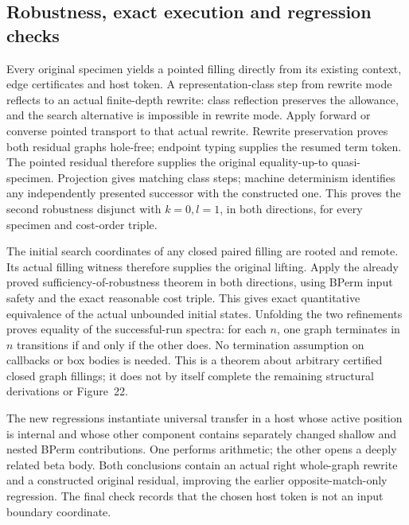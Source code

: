 \subsection{Robustness, exact execution and regression checks}
Every original specimen yields a pointed filling directly from its existing
context, edge certificates and host token. A representation-class step from
rewrite mode reflects to an actual finite-depth rewrite: class reflection
preserves the allowance, and the search alternative is impossible in rewrite
mode. Apply forward or converse pointed transport to that actual rewrite.
Rewrite preservation proves both residual graphs hole-free; endpoint typing
supplies the resumed term token. The pointed residual therefore supplies the
original equality-up-to quasi-specimen. Projection gives matching class
steps; machine determinism identifies any independently presented successor
with the constructed one. This proves the second robustness disjunct with
$k=0,l=1$, in both directions, for every specimen and cost-order triple.


The initial search coordinates of any closed paired filling are rooted and
remote. Its actual filling witness therefore supplies the original lifting.
Apply the already proved sufficiency-of-robustness theorem in both directions,
using BPerm input safety and the exact reasonable cost triple. This gives
exact quantitative equivalence of the actual unbounded initial states.
Unfolding the two refinements proves equality of the successful-run spectra:
for each $n$, one graph terminates in $n$ transitions if and only if the other
does. No termination assumption on callbacks or box bodies is needed.
This is a theorem about arbitrary certified closed graph fillings; it does
not by itself complete the remaining structural derivations or Figure~22.


The new regressions instantiate universal transfer in a host whose active
position is internal and whose other component contains separately changed
shallow and nested BPerm contributions. One performs arithmetic; the other
opens a deeply related beta body. Both conclusions contain an actual right
whole-graph rewrite and a constructed original residual, improving the earlier
opposite-match-only regression. The final check records that the chosen host
token is not an input boundary coordinate.

